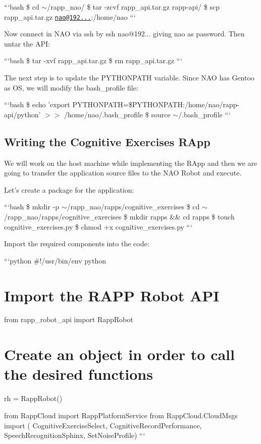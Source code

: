 ```bash \$ cd $\sim$/rapp\-\_\-nao/ \$ tar -\/zcvf rapp\-\_\-api.\-tar.\-gz rapp-\/api/ \$ scp rapp\-\_\-api.\-tar.\-gz \href{mailto:nao@192.168.0.101}{\tt nao@192...}\-:/home/nao ```

Now connect in N\-A\-O via ssh by {\ttfamily ssh nao@192...} giving {\ttfamily nao} as password. Then untar the A\-P\-I\-:

```bash \$ tar -\/xvf rapp\-\_\-api.\-tar.\-gz \$ rm rapp\-\_\-api.\-tar.\-gz ```

The next step is to update the {\ttfamily P\-Y\-T\-H\-O\-N\-P\-A\-T\-H} variable. Since N\-A\-O has Gentoo as O\-S, we will modify the {\ttfamily bash\-\_\-profile} file\-:

```bash \$ echo 'export P\-Y\-T\-H\-O\-N\-P\-A\-T\-H=\$\-P\-Y\-T\-H\-O\-N\-P\-A\-T\-H\-:/home/nao/rapp-\/api/python' $>$$>$ /home/nao/.bash\-\_\-profile \$ source $\sim$/.bash\-\_\-profile ```

\subsection*{Writing the Cognitive Exercises R\-App}

We will work on the host machine while implementing the R\-App and then we are going to transfer the application source files to the N\-A\-O Robot and execute.

Let's create a package for the application\-:

```bash \$ mkdir -\/p $\sim$/rapp\-\_\-nao/rapps/cognitive\-\_\-exercises \$ cd $\sim$/rapp\-\_\-nao/rapps/cognitive\-\_\-exercises \$ mkdir rapps \&\& cd rapps \$ touch cognitive\-\_\-exercises.\-py \$ chmod +x cognitive\-\_\-exercises.\-py ```

Import the required components into the code\-:

```python \#!/usr/bin/env python

\section*{Import the R\-A\-P\-P Robot A\-P\-I}

from rapp\-\_\-robot\-\_\-api import Rapp\-Robot \section*{Create an object in order to call the desired functions}

rh = Rapp\-Robot()

from Rapp\-Cloud import Rapp\-Platform\-Service from Rapp\-Cloud.\-Cloud\-Msgs import ( Cognitive\-Exercise\-Select, Cognitive\-Record\-Performance, Speech\-Recognition\-Sphinx, Set\-Noise\-Profile) ``` 